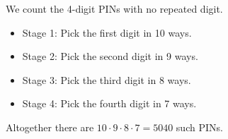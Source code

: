 We count the 4-digit PINs with no repeated digit.

\begin{itemize}
  \item Stage 1: Pick the first digit in 10 ways.
  \item Stage 2: Pick the second digit in 9 ways.
  \item Stage 3: Pick the third digit in 8 ways.
  \item Stage 4: Pick the fourth digit in 7 ways.
\end{itemize}

Altogether there are $10 \cdot 9 \cdot 8 \cdot 7 = 5040$ such PINs.